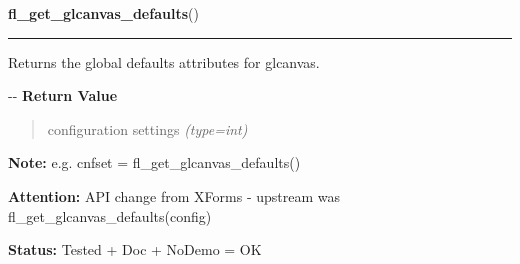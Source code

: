 \hspace{.8\funcindent}\begin{boxedminipage}{\funcwidth}

    \raggedright \textbf{fl\_get\_glcanvas\_defaults}()

    \vspace{-1.5ex}

    \rule{\textwidth}{0.5\fboxrule}
\setlength{\parskip}{2ex}

Returns the global defaults attributes for glcanvas.

-{}-
\setlength{\parskip}{1ex}
      \textbf{Return Value}
    \vspace{-1ex}

      \begin{quote}

configuration settings
      {\it (type=int)}

      \end{quote}

\textbf{Note:} 
e.g. cnfset = fl\_get\_glcanvas\_defaults()


\textbf{Attention:} 
API change from XForms - upstream was
fl\_get\_glcanvas\_defaults(config)


\textbf{Status:} 
Tested + Doc + NoDemo = OK


    \end{boxedminipage}

    \label{xformslib:flglcanvas:fl_set_glcanvas_attributes}

    \vspace{0.5ex}

